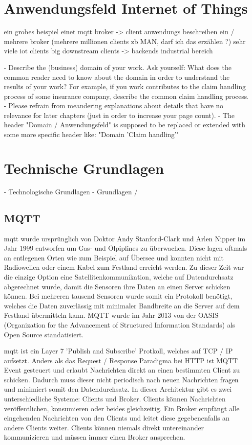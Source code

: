\section{Anwendungsfeld Internet of Things}

ein grobes beispiel einet mqtt broker -> client anwendungs beschreiben
ein / mehrere broker (mehrere millionen clients zb MAN, darf ich das erzählen ?)
sehr viele iot clients
big downstream clients -> backends
industrial bereich

- Describe the (business) domain of your work. Ask yourself: What does the common reader need to know about the domain in order to understand the results of your work? For example, if you work contributes to the claim handling process of some insurance company, describe the common claim handling process.
- Please refrain from meandering explanations about details that have no relevance for later chapters (just in order to increase your page count).
- The header "Domain / Anwendungsfeld" is supposed to be replaced or extended with some more specific header like: "Domain 'Claim handling'"

\section{Technische Grundlagen} - Technologische Grundlagen - Grundlagen /

\subsection{MQTT}
\ac{mqtt} wurde ursprünglich von Doktor Andy Stanford-Clark und Arlen Nipper im Jahr 1999 entworfen um Gas- und Ölpiplines zu überwachen. Diese lagen oftmals an entlegenen Orten wie zum Beispiel auf Übersee und konnten nicht mit Radiowellen oder einem Kabel zum Festland erreicht werden. Zu dieser Zeit war die einzige Option eine Satellitenkommunikation, welche auf Datendurchsatz abgerechnet wurde, damit die Sensoren ihre Daten an einen Server schicken können. Bei mehreren tausend Sensoren wurde somit ein Protokoll benötigt, welches die Daten zuverlässig mit minimaler Bandbreite an die Server auf dem Festland übermitteln kann.
MQTT wurde im Jahr 2013 von der OASIS (Organization for the Advancement of Structured Information Standards) als Open Source standatisiert.

\acs{mqtt} ist ein Layer 7 'Publish and Subscribe' Protkoll, welches auf TCP / IP aufsetzt. Anders als das Request / Response Paradigma bei HTTP ist MQTT Event gesteuert und erlaubt Nachrichten direkt an einen bestimmten Client zu schicken. Dadurch muss dieser nicht periodisch nach neuen Nachrichten fragen und minimiert somit den Datendurchsatz.
In dieser Architektur gibt es zwei unterschiedliche Systeme: Clients und Broker. Clients können Nachrichten veröffentlichen, konsumieren oder beides gleichzeitig.
Ein Broker empfängt alle eingehenden Nachrichten von den Clients und leitet diese gegebenenfalls an andere Clients weiter. Clients können niemals direkt untereinander kommunizieren und müssen immer einen Broker ansprechen.


